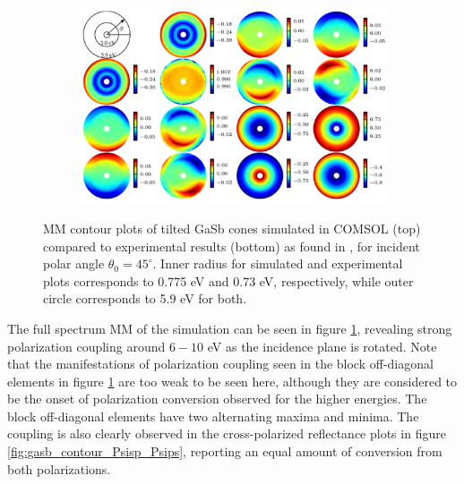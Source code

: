 \begin{figure}
    \begin{subfigure}{\textwidth}
        \centering
        \includegraphics[width=0.9\linewidth]{figures/ch4/gasb/expdata/GasB_exp_contour_MM_theta45.PNG}  
    \end{subfigure}
    \caption{MM contour plots of tilted GaSb cones simulated in COMSOL (top) compared to experimental results (bottom) as found in \cite{gasbcones}, for incident polar angle $\theta_0=45^\circ$. Inner radius for simulated and experimental plots corresponds to 0.775 eV and 0.73 eV, respectively, while outer circle corresponds to 5.9 eV for both.} %
    \label{fig:gasb_contour_MM_simvsexp}
\end{figure}

The full spectrum MM of the simulation can be seen in figure \ref{fig:gasb_contour_MM_simvsexp}, revealing strong polarization coupling around $6-10$ eV as the incidence plane is rotated. Note that the manifestations of polarization coupling seen in the block off-diagonal elements in figure \ref{fig:gasb_contour_MM_simvsexp} are too weak to be seen here, although they are considered to be the onset of polarization conversion observed for the higher energies. The block off-diagonal elements have two alternating maxima and minima. The coupling is also clearly observed in the cross-polarized reflectance plots in figure \ref{fig:gasb_contour_Psisp_Psips}, reporting an equal amount of conversion from both polarizations.

